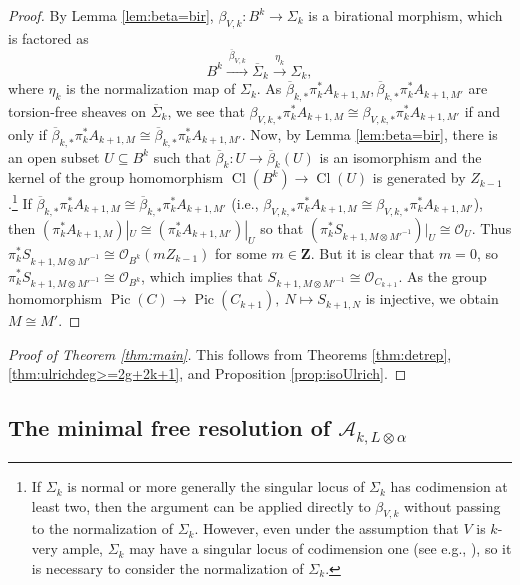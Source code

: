 \documentclass[12pt]{amsart}
\numberwithin{equation}{section}
\numberwithin{thmcounter}{section}
\theoremstyle{definition}
\theoremstyle{claim}
\newcommand{\sO}{\mathscr{O}}
\DeclareMathOperator{\Pic}{Pic}
\begin{document}
\begin{proof}
By Lemma \ref{lem:beta=bir}, $\beta_{V,k} \colon B^k \to \Sigma_k$ is a birational morphism, which is factored as
$$
B^k  \xrightarrow{~\overline{\beta}_{V,k}~} \overline{\Sigma}_k \xrightarrow{~\eta_k~} \Sigma_k,
$$
where $\eta_k$ is the normalization map of $\Sigma_k$. As $\overline{\beta}_{k,*}  \pi_k^* A_{k+1, M},  \overline{\beta}_{k,*} \pi_k^* A_{k+1, M'}$ are torsion-free sheaves on $\overline{\Sigma}_k$, we see that $\beta_{V, k,*} \pi_k^* A_{k+1, M} \cong \beta_{V, k,*} \pi_k^* A_{k+1, M'}$ if and only if $\overline{\beta}_{k,*}  \pi_k^* A_{k+1, M} \cong  \overline{\beta}_{k,*} \pi_k^* A_{k+1, M'}$. Now, by Lemma \ref{lem:beta=bir}, there is an open subset $U \subseteq B^k$ such that $\overline{\beta}_k \colon U \to \overline{\beta}_k(U)$ is an isomorphism and the kernel of the group homomorphism $\operatorname{Cl}(B^k) \to \operatorname{Cl}(U)$ is generated by $Z_{k-1}$.\footnote{If $\Sigma_k$ is normal or more generally the singular locus of $\Sigma_k$ has codimension at least two, then the argument can be applied directly to $\beta_{V,k}$ without passing to the normalization of $\Sigma_k$. However, even under the assumption that $V$ is $k$-very ample, $\Sigma_k$ may have a singular locus of codimension one (see e.g., \cite[Example 4.17]{kummersinn}), so it is necessary to consider the normalization of $\Sigma_k$.}
If $\overline{\beta}_{k,*} \pi_k^* A_{k+1, M} \cong \overline{\beta}_{k,*} \pi_k^* A_{k+1, M'}$ (i.e., $\beta_{V, k,*} \pi_k^* A_{k+1, M} \cong \beta_{V, k,*} \pi_k^* A_{k+1, M'}$), then $(\pi_k^* A_{k+1, M})|_U \cong (\pi_k^* A_{k+1,M'})|_U$ so that $(\pi_k^* S_{k+1, M \otimes {M'}^{-1}})|_U \cong \sO_U$. Thus $\pi_k^* S_{k+1, M \otimes {M'}^{-1}} \cong \sO_{B^k}(mZ_{k-1})$ for some $m \in \mathbf{Z}$. But it is clear that $m=0$, so $\pi_k^* S_{k+1, M \otimes {M'}^{-1}} \cong \sO_{B^k}$, which implies that $ S_{k+1, M \otimes {M'}^{-1}} \cong \sO_{C_{k+1}}$. As the group homomorphism $\Pic(C) \to \Pic(C_{k+1}),~N \mapsto S_{k+1,N}$ is injective, we obtain $M \cong M'$.
\end{proof}

\begin{proof}[Proof of Theorem \ref{thm:main}]
	This follows from Theorems \ref{thm:detrep}, \ref{thm:ulrichdeg>=2g+2k+1}, and Proposition \ref{prop:isoUlrich}.
\end{proof}

\subsection{The minimal free resolution of $\mathscr{A}_{k,L\otimes \alpha}$}\label{subsec:explicitminres}
\end{document}
